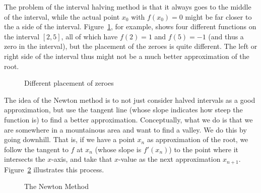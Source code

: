 The problem of the interval halving method is that it always goes to the
middle of the interval, while the actual point $x_0$ with $f(x_0)=0$ might
be far closer to the a side of the interval. Figure~\ref{fignewton4}, for
example, shows four different functions on the interval $[2,5]$, all of
which have $f(2)=1$ and $f(5)=-1$ (and thus a zero in the interval), but the
placement of the zeroes is quite different. The left or right side of the
interval thus might not be a much better approximation of the root.
\begin{figure}
\begin{center}
\end{center}
\caption{Different placement of zeroes}
\label{fignewton4}
\end{figure}

The idea of the Newton method is to not just consider halved intervals
as a good approximation, but use the tangent line (whose slope
indicates how steep the function is) to find a better
approximation. Conceptually, what we do is that we are somewhere in a
mountainous area and want to find a valley. We do this by going downhill.
That
is, if we have a point $x_n$ as approximation of the root, we follow the
tangent to $f$ at $x_n$ (whose slope is $f'(x_n)$) to the point where it
intersects the $x$-axis, and take that $x$-value as the next approximation
$x_{n+1}$. Figure~\ref{fignewtonm} illustrates this process.

\begin{figure}
\begin{center}
\end{center}
\caption{The Newton Method}
\label{fignewtonm}
\end{figure}

